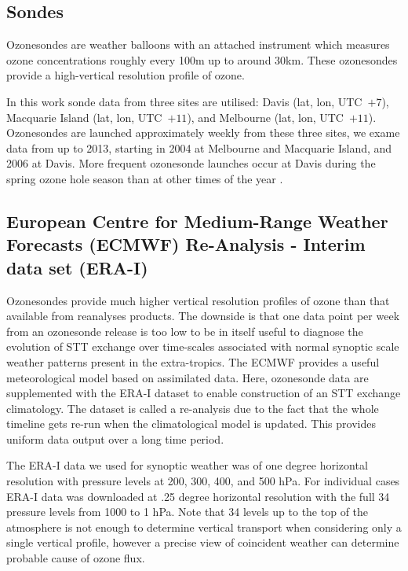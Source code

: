   \subsection{Sondes}
  
    Ozonesondes are weather balloons with an attached instrument which measures ozone concentrations roughly every 100m up to around 30km. These ozonesondes provide a high-vertical resolution profile of ozone.
    
    In this work sonde data from three sites are utilised: Davis (lat, lon, UTC~$+7$), Macquarie Island (lat, lon, UTC~$+11$), and Melbourne (lat, lon, UTC~$+11$).
    Ozonesondes are launched approximately weekly from these three sites, we exame data from up to 2013, starting in 2004 at Melbourne and Macquarie Island, and 2006 at Davis.
    More frequent ozonesonde launches occur at Davis during the spring ozone hole season than at other times of the year \citep{Alexander2013}.
  
  \subsection{European Centre for Medium-Range Weather Forecasts (ECMWF) Re-Analysis - Interim data set (ERA-I)}
    Ozonesondes provide much higher vertical resolution profiles of ozone than that available from reanalyses products.
    The downside is that one data point per week from an ozonesonde release is too low to be in itself useful to diagnose the evolution of STT exchange over time-scales associated with normal synoptic scale weather patterns present in the extra-tropics.
    The ECMWF provides a useful meteorological model based on assimilated data.
    Here, ozonesonde data are supplemented with the ERA-I dataset \citep{Dee2011} to enable construction of an STT exchange climatology.
    The dataset is called a re-analysis due to the fact that the whole timeline gets re-run when the climatological model is updated.
    This provides uniform data output over a long time period.
    
    The ERA-I data we used for synoptic weather was of one degree horizontal resolution with pressure levels at 200, 300, 400, and 500 hPa.
    For individual cases ERA-I data was downloaded at .25 degree horizontal resolution with the full 34 pressure levels from 1000 to 1 hPa.
    Note that 34 levels up to the top of the atmosphere is not enough to determine vertical transport when considering only a single vertical profile, however a precise view of coincident weather can determine probable cause of ozone flux.
    

